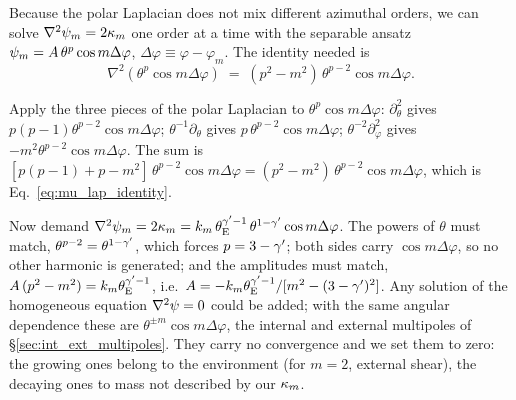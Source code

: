 Because the polar Laplacian does not mix different azimuthal orders,
we can solve $\nabla^2\psi_m = 2\kappa_m$ one order at a time with
the separable ansatz $\psi_m = A\,\theta^{p}\cos m\Delta\varphi$,
$\Delta\varphi\equiv\varphi-\varphi_m$.  The identity needed is
\begin{equation}
    \nabla^2\!\left(\theta^{p}\cos m\Delta\varphi\right)
    \;=\; (p^2 - m^2)\,\theta^{p-2}\cos m\Delta\varphi .
    \label{eq:mu_lap_identity}
\end{equation}

\begin{derivation}
Apply the three pieces of the polar Laplacian to $\theta^p\cos m\Delta\varphi$:
$\partial_\theta^2$ gives $p(p-1)\theta^{p-2}\cos m\Delta\varphi$;
$\theta^{-1}\partial_\theta$ gives $p\,\theta^{p-2}\cos m\Delta\varphi$;
$\theta^{-2}\partial_\varphi^2$ gives $-m^2\theta^{p-2}\cos m\Delta\varphi$.
The sum is $[p(p-1)+p-m^2]\,\theta^{p-2}\cos m\Delta\varphi
=(p^2-m^2)\,\theta^{p-2}\cos m\Delta\varphi$, which is
Eq.~\eqref{eq:mu_lap_identity}.

Now demand $\nabla^2\psi_m = 2\kappa_m = k_m\,\theta_{\mathrm{E}}^{\gamma'-1}\,
\theta^{1-\gamma'}\cos m\Delta\varphi$.
The powers of $\theta$ must match, $\theta^{p-2} = \theta^{1-\gamma'}$,
which forces $p = 3-\gamma'$; both sides carry $\cos m\Delta\varphi$, so no
other harmonic is generated; and the amplitudes must match,
$A\,(p^2-m^2) = k_m\theta_{\mathrm{E}}^{\gamma'-1}$, i.e.\
$A = -k_m\theta_{\mathrm{E}}^{\gamma'-1}/[m^2-(3-\gamma')^2]$.
Any solution of the homogeneous equation $\nabla^2\psi=0$ could be
added; with the same angular dependence these are $\theta^{\pm m}\cos
m\Delta\varphi$, the internal and external multipoles of
\S\ref{sec:int_ext_multipoles}.  They carry no convergence and we set
them to zero: the growing ones belong to the environment (for $m=2$,
external shear), the decaying ones to mass not described by our
$\kappa_m$.
\end{derivation}

